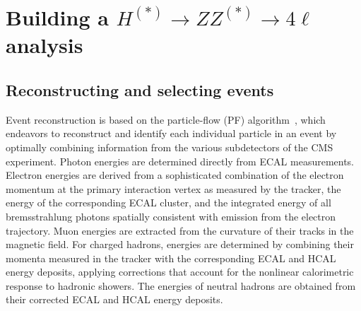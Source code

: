 \section{Building a $H^{(*)} \rightarrow ZZ^{(*)} \rightarrow 4\ell$ analysis}

\subsection{Reconstructing and selecting events}



Event reconstruction is based on the particle-flow (PF) algorithm~\cite{Sirunyan:2017ulk}, which endeavors to reconstruct and identify each individual particle in an event by optimally combining information from the various subdetectors of the CMS experiment. Photon energies are determined directly from ECAL measurements. Electron energies are derived from a sophisticated combination of the electron momentum at the primary interaction vertex as measured by the tracker, the energy of the corresponding ECAL cluster, and the integrated energy of all bremsstrahlung photons spatially consistent with emission from the electron trajectory. Muon energies are extracted from the curvature of their tracks in the magnetic field. For charged hadrons, energies are determined by combining their momenta measured in the tracker with the corresponding ECAL and HCAL energy deposits, applying corrections that account for the nonlinear calorimetric response to hadronic showers. The energies of neutral hadrons are obtained from their corrected ECAL and HCAL energy deposits.

